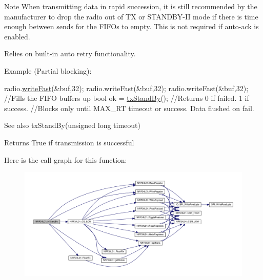 \begin{DoxyNote}{Note}
When transmitting data in rapid succession, it is still recommended by the manufacturer to drop the radio out of TX or S\+T\+A\+N\+D\+B\+Y-\/\+II mode if there is time enough between sends for the F\+I\+F\+Os to empty. This is not required if auto-\/ack is enabled.
\end{DoxyNote}
Relies on built-\/in auto retry functionality.


\begin{DoxyCode}
Example (Partial blocking):

        radio.\hyperlink{classNRF24L01_a693f48de67c8b11ed5860dc481fcfc99}{writeFast}(&buf,32);
        radio.writeFast(&buf,32);
        radio.writeFast(&buf,32);  \textcolor{comment}{//Fills the FIFO buffers up}
        \textcolor{keywordtype}{bool} ok = \hyperlink{classNRF24L01_a4416a731de8d23cac507e8b69ec2becc}{txStandBy}();     \textcolor{comment}{//Returns 0 if failed. 1 if success.}
                                   \textcolor{comment}{//Blocks only until MAX\_RT timeout or success. Data flushed on fail.}
\end{DoxyCode}
 \begin{DoxySeeAlso}{See also}
tx\+Stand\+By(unsigned long timeout) 
\end{DoxySeeAlso}
\begin{DoxyReturn}{Returns}
True if transmission is successful 
\end{DoxyReturn}


Here is the call graph for this function\+:\nopagebreak
\begin{figure}[H]
\begin{center}
\leavevmode
\includegraphics[width=350pt]{classNRF24L01_a4416a731de8d23cac507e8b69ec2becc_cgraph}
\end{center}
\end{figure}


